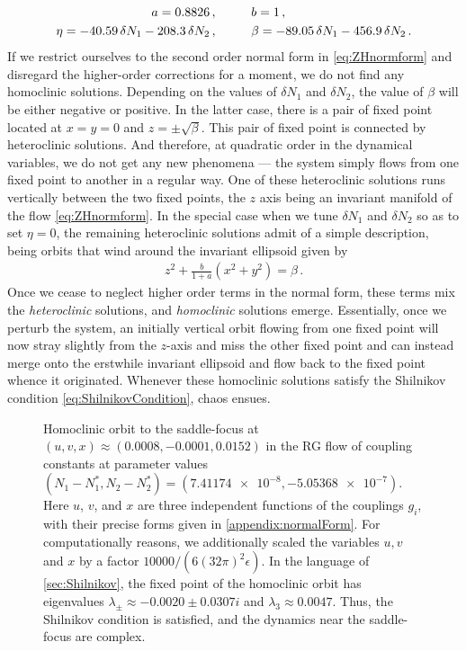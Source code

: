 \begin{align}
 a = 0.8826\,, & \hspace{10mm} b = 1\,,
 \\
 \eta =
 -40.59\,\delta N_1
 -208.3\, \delta N_2\,, &
 \hspace{10mm} \beta = -89.05\,\delta N_1-456.9\, \delta N_2\,.
 \nonumber
\end{align}
If we restrict ourselves to the second order normal form in \cref{eq:ZHnormform} and disregard the higher-order corrections for a moment, we do not find any homoclinic solutions. Depending on the values of $\delta N_1$ and $\delta N_2$, the value of $\beta$ will be either negative or positive. In the latter case, there is a pair of fixed point located at $x=y = 0$ and $z=\pm \sqrt{\beta}$. This pair of fixed point is connected by heteroclinic solutions. And therefore, at quadratic order in the dynamical variables, we do not get any new phenomena --- the system simply flows from one fixed point to another in a regular way. One of these heteroclinic solutions runs vertically between the two fixed points, the $z$ axis being an invariant manifold of the flow \cref{eq:ZHnormform}. In the special case when we tune $\delta N_1$ and $\delta N_2$ so as to set $\eta=0$, the remaining heteroclinic solutions admit of a simple description, being orbits that wind around the invariant ellipsoid given by
\begin{align}
z^2+\frac{b}{1+a}(x^2+y^2)=\beta\,.
\end{align}
Once we cease to neglect higher order terms in the normal form, these terms mix the {\it heteroclinic} solutions, and {\it homoclinic} solutions emerge. Essentially, once we perturb the system, an initially vertical orbit flowing from one fixed point will now stray slightly from the $z$-axis and miss the other fixed point and can instead merge onto the erstwhile invariant ellipsoid and flow back to the fixed point whence it originated. Whenever these homoclinic solutions satisfy the Shilnikov condition \cref{eq:ShilnikovCondition}, chaos ensues.

\begin{figure}
    \centering
    \caption{Homoclinic orbit to the saddle-focus at $(u,v,x) \approx (0.0008, -0.0001, 0.0152)$ in the RG flow of coupling constants at parameter values $(N_1-N_1^*,N_2-N_2^*)=( \num{7.41174e-8},\num{-5.05368e-7})$. Here $u$, $v$, and $x$ are three independent functions of the couplings $g_i$, with their precise forms given in \cref{appendix:normalForm}. For computationally reasons, we additionally scaled the variables $u,v$ and $x$ by a factor $10000/(6(32\pi)^2\epsilon)$. In the language of \cref{sec:Shilnikov}, the fixed point of the homoclinic orbit has eigenvalues $\lambda_{\pm}\approx -0.0020 \pm 0.0307i$  and $\lambda_3 \approx 0.0047$. Thus, the Shilnikov condition is satisfied, and the dynamics near the saddle-focus are complex.
    \label{fig:homoclinic1}}
\end{figure}


